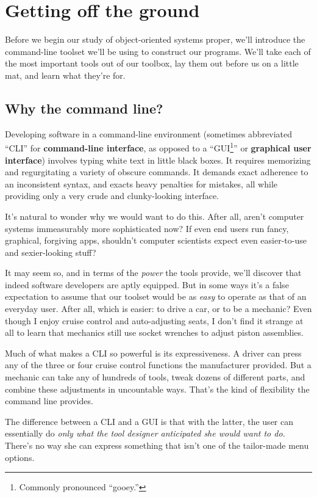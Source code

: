 
\chapter{Getting off the ground}
\label{ch:gettingOff}

Before we begin our study of object-oriented systems proper, we'll introduce
the command-line toolset we'll be using to construct our programs. We'll take
each of the most important tools out of our toolbox, lay them out before us on
a little mat, and learn what they're for.

\section{Why the command line?}

Developing software in a command-line environment (sometimes abbreviated
``CLI'' for \textbf{command-line interface}, as opposed to a
``GUI\footnote{Commonly pronounced ``gooey.''}'' or \textbf{graphical user
interface}) involves typing white text in little black boxes. It requires
memorizing and regurgitating a variety of obscure commands. It demands exact
adherence to an inconsistent syntax, and exacts heavy penalties for mistakes,
all while providing only a very crude and clunky-looking interface.

It's natural to wonder why we would want to do this. After all, aren't
computer systems immeasurably more sophisticated now? If even end users run
fancy, graphical, forgiving apps, shouldn't computer scientists expect even
easier-to-use and sexier-looking stuff?

It may seem so, and in terms of the \textit{power} the tools provide, we'll
discover that indeed software developers are aptly equipped. But in some ways
it's a false expectation to assume that our toolset would be as \textit{easy}
to operate as that of an everyday user. After all, which is easier: to drive a
car, or to be a mechanic? Even though I enjoy cruise control and
auto-adjusting seats, I don't find it strange at all to learn that mechanics
still use socket wrenches to adjust piston assemblies.

Much of what makes a CLI so powerful is its expressiveness. A driver can press
any of the three or four cruise control functions the manufacturer provided.
But a mechanic can take any of hundreds of tools, tweak dozens of different
parts, and combine these adjustments in uncountable ways. That's the kind of 
flexibility the command line provides.

The difference between a CLI and a GUI is that with the latter, the user can
essentially do \textit{only what the tool designer anticipated she would want
to do.} There's no way she can express something that isn't one of the
tailor-made menu options.

